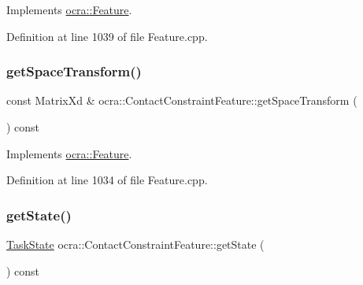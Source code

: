 Implements \hyperlink{classocra_1_1Feature_aeda4c2a5ffe638c3de30f8b91a11450e}{ocra\+::\+Feature}.



Definition at line 1039 of file Feature.\+cpp.

\hypertarget{classocra_1_1ContactConstraintFeature_ac7f34721e72544d13e7030182b55f429}{}\label{classocra_1_1ContactConstraintFeature_ac7f34721e72544d13e7030182b55f429} 
\subsubsection{\texorpdfstring{get\+Space\+Transform()}{getSpaceTransform()}}
{\footnotesize\ttfamily const Matrix\+Xd \& ocra\+::\+Contact\+Constraint\+Feature\+::get\+Space\+Transform (\begin{DoxyParamCaption}{ }\end{DoxyParamCaption}) const\hspace{0.3cm}{\ttfamily [virtual]}}



Implements \hyperlink{classocra_1_1Feature_a77eb324fb4da91fd50d0e761d2453ff3}{ocra\+::\+Feature}.



Definition at line 1034 of file Feature.\+cpp.

\hypertarget{classocra_1_1ContactConstraintFeature_a4a156de21fba41f54c2927232173d334}{}\label{classocra_1_1ContactConstraintFeature_a4a156de21fba41f54c2927232173d334} 
\subsubsection{\texorpdfstring{get\+State()}{getState()}}
{\footnotesize\ttfamily \hyperlink{classocra_1_1TaskState}{Task\+State} ocra\+::\+Contact\+Constraint\+Feature\+::get\+State (\begin{DoxyParamCaption}{ }\end{DoxyParamCaption}) const\hspace{0.3cm}{\ttfamily [virtual]}}



